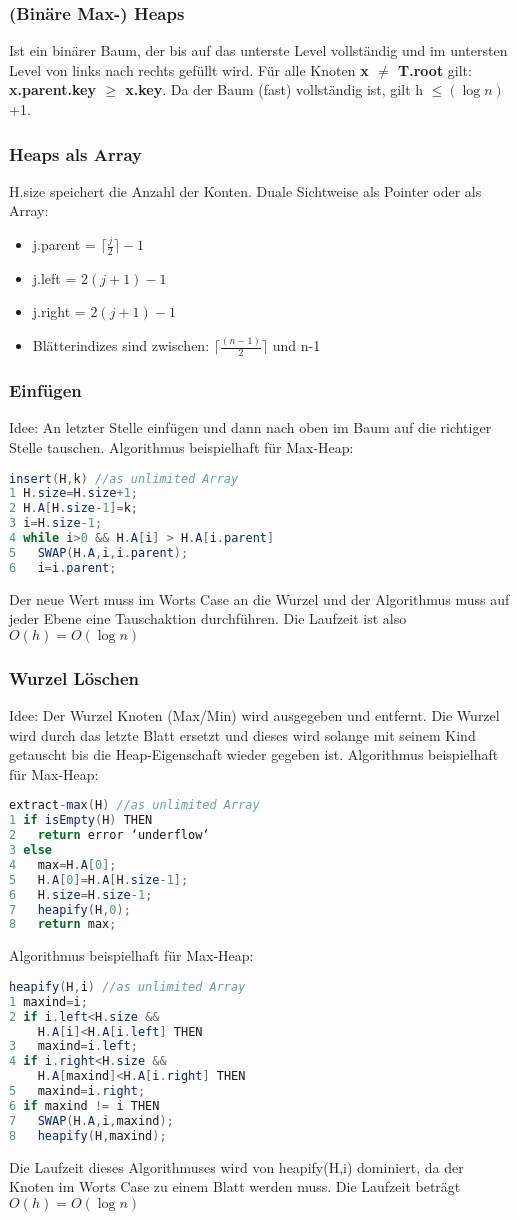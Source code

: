 \documentclass[jou,apacite]{apa6}
\begin{document}
\subsubsection{(Binäre Max-) Heaps}
Ist ein binärer Baum, der bis auf das unterste Level vollständig und im untersten Level von links nach rechts gefüllt wird. Für alle Knoten {\bfseries x $\neq$ T.root} gilt: {\bfseries x.parent.key $\geq$ x.key}. Da der Baum (fast) vollständig ist, gilt  h $\leq (\log n)$+1.
\subsubsection{Heaps als Array}
H.size speichert die Anzahl der Konten.
Duale Sichtweise als Pointer oder als Array:
\begin{itemize}
    \item j.parent = $\lceil{}\frac{j}{2}\rceil -1$
    \item j.left = $2(j+1) - 1$
    \item j.right = $2(j+1) -1$
    \item Blätterindizes sind zwischen: $\lceil{}\frac{(n-1)}{2}\rceil$ und n-1
\end{itemize}

\subsubsection{Einfügen}
Idee: An letzter Stelle einfügen und dann nach oben im Baum auf die richtiger Stelle tauschen.
Algorithmus beispielhaft für Max-Heap:
\begin{lstlisting}[language=java]
insert(H,k) //as unlimited Array
1 H.size=H.size+1;
2 H.A[H.size-1]=k;
3 i=H.size-1;
4 while i>0 && H.A[i] > H.A[i.parent]
5   SWAP(H.A,i,i.parent);
6   i=i.parent;
\end{lstlisting}
Der neue Wert muss im Worts Case an die Wurzel und der Algorithmus muss auf jeder Ebene eine Tauschaktion durchführen. Die Laufzeit ist also $O(h) = O(\log n)$ 
\subsubsection{Wurzel Löschen}
Idee: Der Wurzel Knoten (Max/Min) wird ausgegeben und entfernt. Die Wurzel wird durch das letzte Blatt ersetzt und dieses wird solange mit seinem Kind getauscht bis die Heap-Eigenschaft wieder gegeben ist. 
Algorithmus beispielhaft für Max-Heap:
\begin{lstlisting}[language=java]
extract-max(H) //as unlimited Array
1 if isEmpty(H) THEN
2   return error ‘underflow‘
3 else
4   max=H.A[0];
5   H.A[0]=H.A[H.size-1];
6   H.size=H.size-1;
7   heapify(H,0);
8   return max;
\end{lstlisting}
Algorithmus beispielhaft für Max-Heap:
\begin{lstlisting}[language=java]
heapify(H,i) //as unlimited Array
1 maxind=i;
2 if i.left<H.size && 
    H.A[i]<H.A[i.left] THEN
3   maxind=i.left;
4 if i.right<H.size && 
    H.A[maxind]<H.A[i.right] THEN
5   maxind=i.right;
6 if maxind != i THEN
7   SWAP(H.A,i,maxind);
8   heapify(H,maxind);
\end{lstlisting}
Die Laufzeit dieses Algorithmuses wird von heapify(H,i) dominiert, da der Knoten im Worts Case zu einem Blatt werden muss. Die Laufzeit beträgt $O(h) = O(\log n)$
\end{document}
